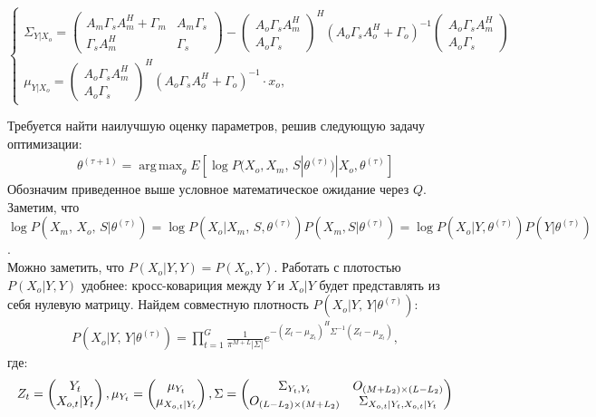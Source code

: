 \documentclass[11pt]{article}
\DeclareMathOperator*{\argmax}{arg\,max}
\begin{document}
\begin{equation}
\left\{ \begin{gathered} 
\Sigma_{Y|X_o} = \begin{pmatrix}
A_m \Gamma_s A_m^H + \Gamma_m&A_m \Gamma_s\\
\Gamma_s A_m^H&\Gamma_s
\end{pmatrix}- \begin{pmatrix}
A_o\Gamma_s A_m^H\\
A_o\Gamma_s
\end{pmatrix}^H(A_o\Gamma_sA_o^H+\Gamma_o)^{-1} \begin{pmatrix}
A_o\Gamma_s A_m^H\\
A_o\Gamma_s
\end{pmatrix} \\
\mu_{Y|X_o} =   \begin{pmatrix}
A_o\Gamma_s A_m^H\\
A_o\Gamma_s
\end{pmatrix}^H(A_o\Gamma_sA_o^H+\Gamma_o)^{-1}\cdot x_o,
\end{gathered} \right.
\end{equation}
\begin{center}
\fontsize{16}{20}\selectfont {}
\end{center}
Требуется найти наилучшую оценку параметров, решив следующую задачу оптимизации:
\begin{gather}
\theta^{(\tau+1)}=\argmax_{\theta} E[\log P(X_o, X_m, \, S|\theta^{(\tau)})|X_o, \theta^{(\tau)}]
\end{gather}
Обозначим приведенное выше условное математическое ожидание через $Q$. 
Заметим, что \\ $\log P(X_m, \, X_o, \, S|\theta^{(\tau)}) = \log P(X_o|X_m, \, S,\theta^{(\tau)})P(X_m, S|\theta^{(\tau)}) = \log P(X_o|Y,\theta^{(\tau)})P(Y|\theta^{(\tau)})$.\\
Можно заметить, что $P(X_o|Y, Y) = P(X_o, Y)$. Работать с плотостью $P(X_o|Y, Y)$ удобнее: кросс-ковариция между $Y$ и $X_o|Y$ будет представлять из себя нулевую матрицу.
Найдем совместную плотность $P(X_o|Y, \, Y|\theta^{(\tau)})$:
\begin{gather}
P(X_o|Y, \, Y|\theta^{(\tau)}) = \prod_{t=1}^G \frac{1}{\pi^{M+L}|\Sigma|}e^{-(Z_t-\mu_{Z_t})^H\Sigma^{-1}(Z_t-\mu_{Z_t})},
\end{gather}
где:
\begin{equation*}
Z_t = \begin{pmatrix}
Y_t\\
X_{o,t}|Y_t
\end{pmatrix},
\mu_{Y_t} = \begin{pmatrix}
\mu_{Y_t}\\
\mu_{X_{o,t}|Y_t}
\end{pmatrix}\\,
\Sigma = 
\begin{pmatrix}
\Sigma_{Y_t,Y_t}&O_{(M+L_2)\times (L-L_2)}\\
O_{(L-L_2)\times (M+L_2)}&\Sigma_{X_{o,t}|Y_t,X_{o,t}|Y_t}
\end{pmatrix}
\end{equation*}
\end{document}
